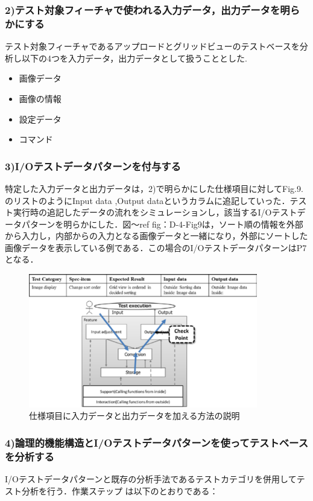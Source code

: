 \documentclass[a4paper,11pt]{jreport}
\begin{document}
\subsubsection{2)テスト対象フィーチャで使われる入力データ，出力データを明らかにする}
テスト対象フィーチャであるアップロードとグリッドビューのテストベースを分析し以下の4つを入力データ，出力データとして扱うこととした.
\begin{itemize}
 \item 画像データ
 \item 画像の情報
 \item 設定データ
  \item コマンド
\end{itemize}


\subsubsection{3)I/Oテストデータパターンを付与する}
特定した入力データと出力データは，2)で明らかにした仕様項目に対してFig.9.のリストのようにInput data ,Output dataというカラムに追記していった．テスト実行時の追記したデータの流れをシミュレーションし，該当するI/Oテストデータパターンを明らかにした．図〜ref {fig：D-4-Fig9}は，ソート順の情報を外部から入力し，内部からの入力となる画像データと一緒になり，外部にソートした画像データを表示している例である．この場合のI/OテストデータパターンはP7となる．
   \begin{figure}[htbp]
  \begin{center}
  \includegraphics[width=10cm]{./image/D-4-Fig9.png}
  \caption{仕様項目に入力データと出力データを加える方法の説明}
  \label{fig:D-4-Fig9}
  \end{center}
   \end{figure}



\subsubsection{4)論理的機能構造とI/Oテストデータパターンを使ってテストベースを分析する}
I/Oテストデータパターンと既存の分析手法であるテストカテゴリを併用してテスト分析を行う．作業ステップ
は以下のとおりである：
\end{document}
